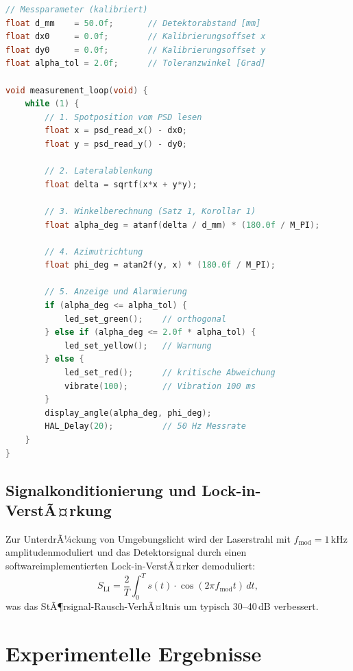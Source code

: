 ﻿\documentclass[a4paper,12pt]{article}
\theoremstyle{definition}
\begin{document}
\begin{lstlisting}[language=C, caption=Pseudocode des Echtzeit-Messzyklus auf dem STM32]
// Messparameter (kalibriert)
float d_mm    = 50.0f;       // Detektorabstand [mm]
float dx0     = 0.0f;        // Kalibrierungsoffset x
float dy0     = 0.0f;        // Kalibrierungsoffset y
float alpha_tol = 2.0f;      // Toleranzwinkel [Grad]

void measurement_loop(void) {
    while (1) {
        // 1. Spotposition vom PSD lesen
        float x = psd_read_x() - dx0;
        float y = psd_read_y() - dy0;

        // 2. Lateralablenkung
        float delta = sqrtf(x*x + y*y);

        // 3. Winkelberechnung (Satz 1, Korollar 1)
        float alpha_deg = atanf(delta / d_mm) * (180.0f / M_PI);

        // 4. Azimutrichtung
        float phi_deg = atan2f(y, x) * (180.0f / M_PI);

        // 5. Anzeige und Alarmierung
        if (alpha_deg <= alpha_tol) {
            led_set_green();    // orthogonal
        } else if (alpha_deg <= 2.0f * alpha_tol) {
            led_set_yellow();   // Warnung
        } else {
            led_set_red();      // kritische Abweichung
            vibrate(100);       // Vibration 100 ms
        }
        display_angle(alpha_deg, phi_deg);
        HAL_Delay(20);          // 50 Hz Messrate
    }
}
\end{lstlisting}

\subsection{Signalkonditionierung und Lock-in-VerstÃ¤rkung}

Zur UnterdrÃ¼ckung von Umgebungslicht wird der Laserstrahl mit
$f_{\mathrm{mod}} = 1\,\mathrm{kHz}$ amplitudenmoduliert und das Detektorsignal
durch einen softwareimplementierten Lock-in-VerstÃ¤rker demoduliert:
\[
  S_{\mathrm{LI}} = \frac{2}{T} \int_0^T s(t) \cdot \cos(2\pi f_{\mathrm{mod}} t)\, dt,
\]
was das StÃ¶rsignal-Rausch-VerhÃ¤ltnis um typisch 30--40\,dB verbessert.

\section{Experimentelle Ergebnisse}
\end{document}
